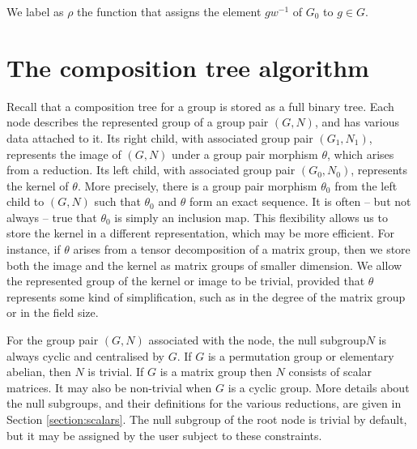 \documentclass[12pt,twoside,reqno,psamsfonts]{amsproc}
\newcommand{\repgp}{{represented group}\xspace}
\newcommand{\nullsubgp}{{null subgroup}\xspace}
\numberwithin{equation}{section}
\numberwithin{figure}{section}
\newcounter{algorithm}
\theoremstyle{plain}
\theoremstyle{definition}
\theoremstyle{remark}
\begin{document}
We label as $\rho$ 
the function that assigns the element $gw^{-1}$ of $G_0$ to $g \in G$. 

\section{The composition tree algorithm}
\label{section:algorithm}
Recall that a composition tree for a group is stored as a full binary tree. 
Each node describes the \repgp of a group pair $(G,N)$,
and has various data attached to it.
Its right child, with associated group pair $(G_1,N_1)$,
represents the image of $(G,N)$ under a group pair morphism
$\theta$, which arises from a reduction. 
Its left child, with associated group pair 
$(G_0,N_0)$, represents the kernel
of $\theta$. More precisely,
there is a group pair morphism $\theta_0$ from the left child to
$(G,N)$ such that $\theta_0$ and $\theta$ form an exact sequence.
It is often -- but not always -- true that $\theta_0$ is simply 
an inclusion map.
This flexibility allows us to store the kernel in a different
representation, which may be more efficient. For instance, if $\theta$
arises from a tensor decomposition of a matrix group, then we store
both the image and the kernel as matrix groups of smaller dimension.
We allow the represented group of the kernel or image to be trivial, provided
that $\theta$ represents some kind of simplification, such as in the degree of
the matrix group or in the field size.

For the group pair $(G,N)$ associated with the node, the \nullsubgp $N$ is
always cyclic and centralised by $G$.
If $G$ is a permutation group or elementary
abelian, then $N$ is trivial. If $G$ is a matrix group then $N$ 
consists of scalar matrices. It may also be non-trivial when $G$ is a cyclic
group.  More details about the null subgroups, and their definitions 
for the various reductions, are given in
Section \ref{section:scalars}. 
The \nullsubgp of the root node is trivial by default, but it may be assigned
by the user subject to these constraints.
\end{document}
